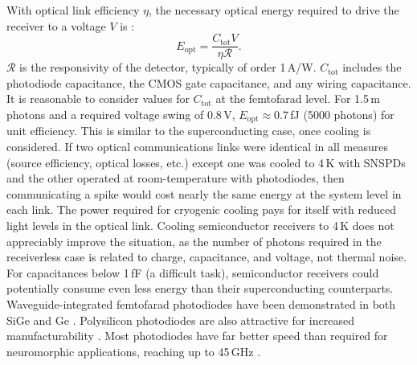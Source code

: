 \documentclass[twocolumn]{article}
\begin{document}
With optical link efficiency $\eta$, the necessary optical energy required to drive the receiver to a voltage $V$ is \cite{miller2017attojoule}:
\begin{equation}
\label{eq: semi}
    E_{\mathrm{opt}} = \frac{C_{\mathrm{tot}} V}{\eta \mathcal{R}}.
\end{equation}
$\mathcal{R}$ is the responsivity of the detector, typically of order 1\,A/W. $C_{\mathrm{tot}}$ includes the photodiode capacitance, the CMOS gate capacitance, and any wiring capacitance. It is reasonable to consider values for $C_{\mathrm{tot}}$ at the femtofarad level. For 1.5\,\textmu m photons and a required voltage swing of 0.8\,V, $E_{\mathrm{opt}} \approx 0.7 $\,fJ (5000 photons) for unit efficiency. This is similar to the superconducting case, once cooling is considered. If two optical communications links were identical in all measures (source efficiency, optical losses, etc.) except one was cooled to 4\,K with SNSPDs and the other operated at room-temperature with photodiodes, then communicating a spike would cost nearly the same energy at the system level in each link. The power required for cryogenic cooling pays for itself with reduced light levels in the optical link. Cooling semiconductor receivers to 4\,K does not appreciably improve the situation, as the number of photons required in the receiverless case is related to charge, capacitance, and voltage, not thermal noise. For capacitances below 1\,fF (a difficult task), semiconductor receivers could potentially consume even less energy than their superconducting counterparts. Waveguide-integrated femtofarad photodiodes have been demonstrated in both SiGe and Ge \cite{derose2011ultra}. Polysilicon photodiodes are also attractive for increased manufacturability \cite{meor2014}. Most photodiodes have far better speed than required for neuromorphic applications, reaching up to 45\,GHz \cite{derose2011ultra}.
\end{document}
